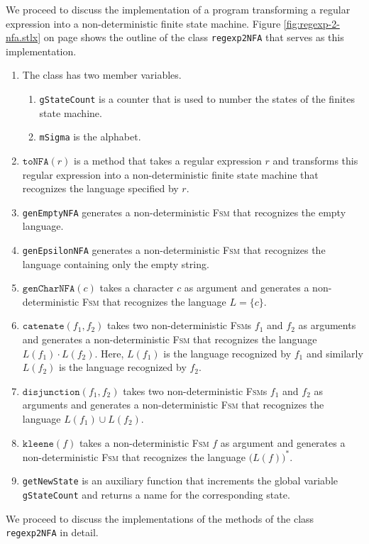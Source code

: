 \noindent
We proceed to discuss the implementation of a program transforming a regular expression into a
non-deterministic finite state machine.
Figure \ref{fig:regexp-2-nfa.stlx} on page \pageref{fig:regexp-2-nfa.stlx} shows the outline of the
class \texttt{regexp2NFA} that serves as this implementation.  
\begin{enumerate}
\item The class has two member variables.
      \begin{enumerate}
      \item \texttt{gStateCount} is a counter that is used to number the states of the finites state
            machine.
      \item \texttt{mSigma} is the alphabet.
      \end{enumerate}
\item $\texttt{toNFA}(r)$ is a method that takes a regular expression $r$ and transforms this regular
      expression into a non-deterministic finite state machine that recognizes the language
      specified by $r$.
\item \texttt{genEmptyNFA} generates a non-deterministic \textsc{Fsm} that recognizes the empty language. 
\item \texttt{genEpsilonNFA} generates a non-deterministic \textsc{Fsm} that recognizes the language
      containing only the empty string. 
\item $\texttt{genCharNFA}(c)$ takes a character $c$ as argument and generates a non-deterministic \textsc{Fsm} that recognizes the
      language $L = \{ c \}$.
\item $\texttt{catenate}(f_1, f_2)$ takes two non-deterministic \textsc{Fsm}s $f_1$ and $f_2$ as arguments and
      generates a non-deterministic \textsc{Fsm} that recognizes the language $L(f_1) \cdot L(f_2)$.
      Here, $L(f_1)$ is the language recognized by $f_1$ and similarly $L(f_2)$ is the language
      recognized by $f_2$.
\item $\texttt{disjunction}(f_1, f_2)$ takes two non-deterministic \textsc{Fsm}s $f_1$ and $f_2$ as arguments and
      generates a non-deterministic \textsc{Fsm} that recognizes the language $L(f_1) \cup L(f_2)$.
\item $\texttt{kleene}(f)$ takes a non-deterministic \textsc{Fsm} $f$ as argument and
      generates a non-deterministic \textsc{Fsm} that recognizes the language $\bigl(L(f)\bigr)^*$.
\item \texttt{getNewState} is an auxiliary function that increments the global variable \texttt{gStateCount} and returns a name
      for the corresponding state.
\end{enumerate}
We proceed to discuss the implementations of the methods of the class \texttt{regexp2NFA} in detail.


